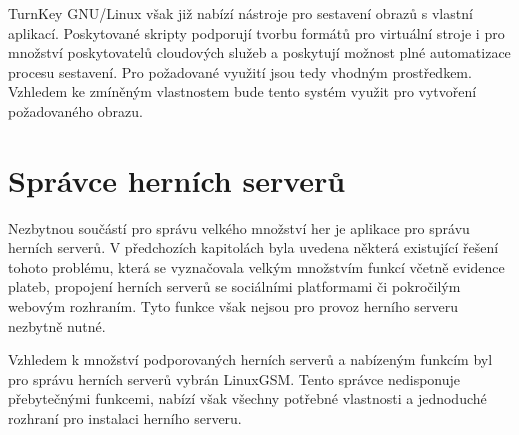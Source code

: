 TurnKey GNU/Linux však již nabízí nástroje pro sestavení obrazů s vlastní aplikací. Poskytované skripty podporují tvorbu formátů
pro virtuální stroje i pro množství poskytovatelů cloudových služeb a poskytují možnost plné automatizace procesu sestavení.
Pro požadované využití jsou tedy vhodným prostředkem. Vzhledem ke zmíněným vlastnostem bude tento systém využit pro vytvoření
požadovaného obrazu.

\section{Správce herních serverů}

Nezbytnou součástí pro správu velkého množství her je aplikace pro správu herních serverů. V předchozích kapitolách
byla uvedena některá existující řešení tohoto problému, která se vyznačovala velkým množstvím funkcí včetně
evidence plateb, propojení herních serverů se sociálními platformami či pokročilým webovým rozhraním.
Tyto funkce však nejsou pro provoz herního serveru nezbytně nutné.

Vzhledem k množství podporovaných herních serverů a nabízeným funkcím byl pro správu herních serverů vybrán LinuxGSM.
Tento správce nedisponuje přebytečnými funkcemi, nabízí však všechny potřebné vlastnosti a jednoduché rozhraní pro instalaci
herního serveru.
